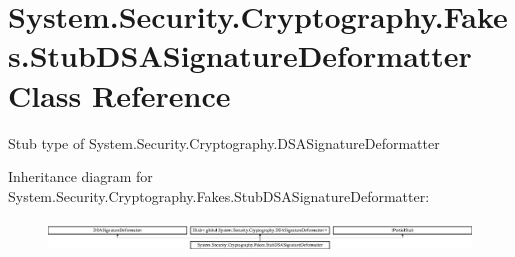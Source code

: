\hypertarget{class_system_1_1_security_1_1_cryptography_1_1_fakes_1_1_stub_d_s_a_signature_deformatter}{\section{System.\-Security.\-Cryptography.\-Fakes.\-Stub\-D\-S\-A\-Signature\-Deformatter Class Reference}
\label{class_system_1_1_security_1_1_cryptography_1_1_fakes_1_1_stub_d_s_a_signature_deformatter}
}


Stub type of System.\-Security.\-Cryptography.\-D\-S\-A\-Signature\-Deformatter 


Inheritance diagram for System.\-Security.\-Cryptography.\-Fakes.\-Stub\-D\-S\-A\-Signature\-Deformatter\-:\begin{figure}[H]
\begin{center}
\leavevmode
\includegraphics[height=0.862202cm]{class_system_1_1_security_1_1_cryptography_1_1_fakes_1_1_stub_d_s_a_signature_deformatter}
\end{center}
\end{figure}
